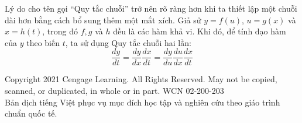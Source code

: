 \begin{minipage}[t]{0.71\textwidth}
    \vspace{0.45cm}
    Lý do cho tên gọi “Quy tắc chuỗi” trở nên rõ ràng hơn khi ta thiết lập một chuỗi dài hơn bằng cách bổ sung thêm một mắt xích. Giả sử $y = f(u)$, $u = g(x)$ và $x = h(t)$, trong đó $f, g$ và $h$ đều là các hàm khả vi. Khi đó, để tính đạo hàm của $y$ theo biến $t$, ta sử dụng Quy tắc chuỗi hai lần:
    \begin{equation*}
        \frac{dy}{dt} = \frac{dy}{dx} \frac{dx}{dt} = \frac{dy}{du} \frac{du}{dx} \frac{dx}{dt}
    \end{equation*}
\end{minipage}

\vfill
\begin{center}
    \fontsize{6.5pt}{8pt}\selectfont \color{stewartgray}
    Copyright 2021 Cengage Learning. All Rights Reserved. May not be copied, scanned, or duplicated, in whole or in part. WCN 02-200-203\\
    Bản dịch tiếng Việt phục vụ mục đích học tập và nghiên cứu theo giáo trình chuẩn quốc tế.
\end{center}
